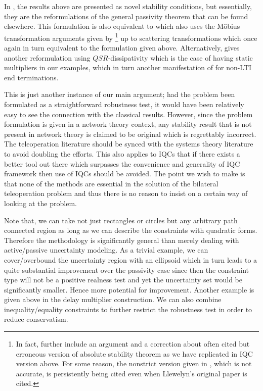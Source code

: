 \begin{rem}
In \cite{jazayeri}, the results above are presented as novel stability conditions, but essentially, they are the reformulations of 
the general passivity theorem that can be found elsewhere. This formulation is also equivalent to \cite{haddadizaad} which also uses 
the M\"{o}bius transformation arguments given by \cite{edsin}\footnote{In fact, \cite{edsin,lombardi} further include an argument and 
a correction about often cited but erroneous version of absolute stability theorem as we have replicated in IQC version above. For some 
reason, the nonstrict version given in \cite{haykin}, which is not accurate, is persistently being cited even when Llewelyn's original
paper is cited.} up to scattering transformations which once again in turn equivalent to the formulation given above. Alternatively, 
\cite{hirchebuss} gives another reformulation using $QSR$-dissipativity which is the case of having static multipliers in our examples, 
which in turn another manifestation of \cite[Thm. 6.2]{khalil} for non-LTI end terminations. 

This is just another instance of our main argument; had the problem been formulated as a straightforward robustness test, 
it would have been relatively easy to see the connection with the classical results. However, since the problem formulation is given 
in a network theory context, any stability result that is not present in network theory is claimed to be original which is regrettably 
incorrect. The teleoperation literature should be synced with the systems theory literature to avoid doubling the efforts. This also 
applies to IQCs that if there exists a better tool out there which surpasses the convenience and generality of IQC framework then use 
of IQCs should be avoided. The point we wish to make is that none of the methods are essential in the solution of the bilateral 
teleoperation problem and thus there is no reason to insist on a certain way of looking at the problem.
\end{rem}


Note that, we can take not just rectangles or circles but any arbitrary path connected region as long as we can describe 
the constraints with quadratic forms. Therefore the methodology is significantly general than merely dealing with active/passive
uncertainty modeling. As a trivial example, we can cover/overbound the uncertainty region with an ellipsoid which in turn leads to
a quite substantial improvement over the passivity case since then the constraint type will not be a positive realness test and 
yet the uncertainty set would be significantly smaller. Hence more potential for improvement. Another example is given above in the 
delay multiplier construction. We can also combine inequality/equality constraints to further restrict the robustness test in
order to reduce conservatism. 

